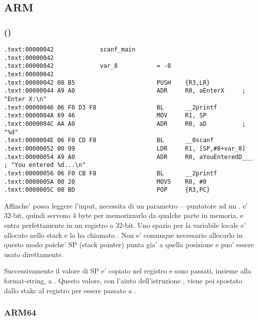 \subsection{ARM}

\subsubsection{\OptimizingKeilVI (\ThumbMode)}

\begin{lstlisting}
.text:00000042             scanf_main
.text:00000042
.text:00000042             var_8           = -8
.text:00000042
.text:00000042 08 B5                       PUSH    {R3,LR}
.text:00000044 A9 A0                       ADR     R0, aEnterX     ; "Enter X:\n"
.text:00000046 06 F0 D3 F8                 BL      __2printf
.text:0000004A 69 46                       MOV     R1, SP
.text:0000004C AA A0                       ADR     R0, aD          ; "%d"
.text:0000004E 06 F0 CD F8                 BL      __0scanf
.text:00000052 00 99                       LDR     R1, [SP,#8+var_8]
.text:00000054 A9 A0                       ADR     R0, aYouEnteredD___ ; "You entered %d...\n"
.text:00000056 06 F0 CB F8                 BL      __2printf
.text:0000005A 00 20                       MOVS    R0, #0
.text:0000005C 08 BD                       POP     {R3,PC}
\end{lstlisting}

\myindex{\CLanguageElements!\Pointers}

Affinche' \scanf possa leggere l'input, necessita di un parametro ---puntatore ad un \Tint.
\Tint e' 32-bit, quindi servono 4 byte per memorizzarlo da qualche parte in memoria, e entra perfettamente in un registro a 32-bit.
Uno spazio per la variabile locale  e' allocato nello stack e \IDA
lo ha chiamato . Non e' comunque necessario allocarlo in questo modo poiche' \ac{SP} (\gls{stack pointer}) punta gia' a quella posizione e puo' essere usato direttamente.

Successivamente il valore di \ac{SP} e' copiato nel registro  e sono passati, insieme alla format-string, a \scanf.
Questo valore, con l'aiuto dell'istruzione  , viene poi spostato dallo stakc al registro  per essere passato a \printf.

\subsubsection{ARM64}

